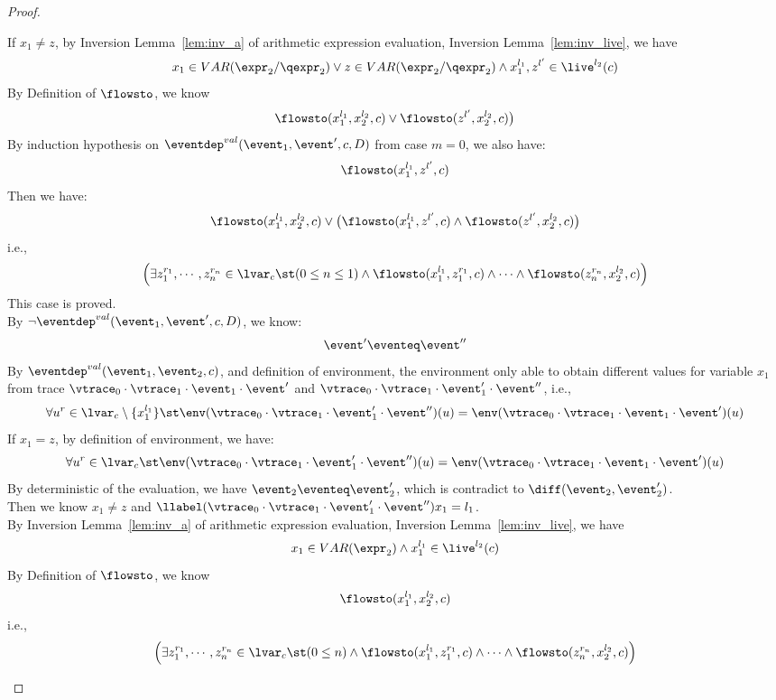 {\begin{proof}
\begin{case}[$\trace_2 = \trace_{ih} \cdot \event_{ih}$]
\begin{subcase}
If $x_1 \neq z$, by {Inversion Lemma~\ref{lem:inv_a}} of arithmetic expression evaluation, Inversion Lemma~\ref{lem:inv_live}, we have 
%
\[
  x_1 \in VAR(\expr_2 / \qexpr_2) \lor z \in VAR(\expr_2 / \qexpr_2) 
  \land x_1^{l_1}, z^{l'} \in \live^{l_2}(c)
\]
%
By Definition of $\flowsto$, we know
\[
  \flowsto(x_1^{l_1}, x_2^{l_2}, c) \lor \flowsto(z^{l'}, x_2^{l_2}, c) \big)
\]
%
By induction hypothesis on $\eventdep^{val}(\event_1, \event', c, D)$ from case $m = 0$, we also have:
\[
  \flowsto(x_1^{l_1}, z^{l'}, c)
\]
%
Then we have:
%
\[
  \flowsto(x_1^{l_1}, x_2^{l_2}, c) \lor  \big( \flowsto(x_1^{l_1}, z^{l'}, c) \land \flowsto(z^{l'}, x_2^{l_2}, c) \big)
\]
%
i.e.,
%
\[
\Big(\exists z_1^{r_1}, \cdots, z_n^{r_n} \in \lvar_{{c}} \st (0 \leq n \leq 1 )
 \land \flowsto(x_1^{l_1}, z_1^{r_1}, c) \land \cdots \land \flowsto(z_n^{r_n}, {x}_2^{l_2}, c) \Big)
\]
%
This case is proved.
%
\\
By $\neg \eventdep^{val}(\event_1, \event', c, D)$, we know:
\[
  \event' \eventeq \event''
\]
%
By $\eventdep^{val}(\event_1, \event_2, c)$, and definition of environment, 
the environment only able to obtain different values for variable $x_1$
from trace $\vtrace_0 \cdot \vtrace_1 \cdot \event_1 \cdot \event'$ and 
$\vtrace_0 \cdot \vtrace_1 \cdot \event_1' \cdot \event''$, i.e.,
\[
  \forall u^r \in \lvar_c \setminus \{x_1^{l_1}\} \st
  \env(\vtrace_0 \cdot \vtrace_1 \cdot \event_1' \cdot \event'') (u) =  
  \env(\vtrace_0 \cdot \vtrace_1 \cdot \event_1 \cdot \event') (u)
\]
%
If $x_1 = z$, by definition of environment, we have:
\[
    \forall u^r \in \lvar_c \st
  \env(\vtrace_0 \cdot \vtrace_1 \cdot \event_1' \cdot \event'') (u) =  
  \env(\vtrace_0 \cdot \vtrace_1 \cdot \event_1 \cdot \event') (u)
\]
By deterministic of the evaluation, we have $\event_2 \eventeq \event_2'$, which is contradict to $\diff(\event_2, \event_2')$.
%
\\
Then we know $x_1 \neq z$ and $\llabel(\vtrace_0 \cdot \vtrace_1 \cdot \event_1' \cdot \event'') x_1 = l_1$.
\\
%
By {Inversion Lemma~\ref{lem:inv_a}} of arithmetic expression evaluation, Inversion Lemma~\ref{lem:inv_live}, we have 
\[
  x_1 \in VAR(\expr_2) \land x_1^{l_1} \in \live^{l_2}(c)
\]
%
By Definition of $\flowsto$, we know
\[
  \flowsto(x_1^{l_1}, x_2^{l_2}, c) 
\]
%
i.e.,
%
\[
\Big(\exists z_1^{r_1}, \cdots, z_n^{r_n} \in \lvar_{{c}} \st (0 \leq n  )
 \land \flowsto(x_1^{l_1}, z_1^{r_1}, c) \land \cdots \land \flowsto(z_n^{r_n}, {x}_2^{l_2}, c) \Big)
\]
\end{subcase}
\end{case}
\end{proof}}
